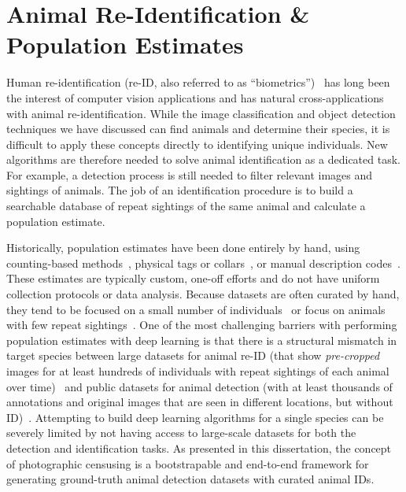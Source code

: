 \section{Animal Re-Identification \& Population Estimates}

Human re-identification (re-ID, also referred to as ``biometrics'')~\cite{zhang_alignedreid_2017,huang_labeled_2008,huang_labeled_2014,learned-miller_labeled_2016} has long been the interest of computer vision applications and has natural cross-applications with animal re-identification.  While the image classification and object detection techniques we have discussed can find animals and determine their species, it is difficult to apply these concepts directly to identifying unique individuals.  New algorithms are therefore needed to solve animal identification as a dedicated task.  For example, a detection process is still needed to filter relevant images and sightings of animals. The job of an identification procedure is to build a searchable database of repeat sightings of the same animal and calculate a population estimate.

Historically, population estimates have been done entirely by hand, using counting-based methods~\cite{simpson_zooniverse:_2014,swanson_snapshot_2015,forrester_emammalcitizen_2014,chase_continent-wide_2016}, physical tags or collars~\cite{juang_energy-efficient_2002,mukinya_identification_1976,alexander_african_1994,mech_critique_2002,thouless_long_1995}, or manual description codes~\cite{lahiri_biometric_2011,patrick_demographic_2003,sikes_guidelines_2011}.  These estimates are typically custom, one-off efforts and do not have uniform collection protocols or data analysis.  Because datasets are often curated by hand, they tend to be focused on a small number of individuals~\cite{schneider_similarity_2020} or focus on animals with few repeat sightings~\cite{polzounov_right_2016}.  One of the most challenging barriers with performing population estimates with deep learning is that there is a structural mismatch in target species between large datasets for animal re-ID (that show \textit{pre-cropped} images for at least hundreds of individuals with repeat sightings of each animal over time)~\cite{li_atrw_2019,korschens_elpephants_2019,tausch_bumblebee_2020} and public datasets for animal detection (with at least thousands of annotations and original images that are seen in different locations, but without ID)~\cite{swanson_snapshot_2015,beery_iwildcam_2019,khan_animalweb_2019,nugent_inaturalist_2018}.  Attempting to build deep learning algorithms for a single species can be severely limited by not having access to large-scale datasets for both the detection and identification tasks.  As presented in this dissertation, the concept of photographic censusing is a bootstrapable and end-to-end framework for generating ground-truth animal detection datasets with curated animal IDs.

